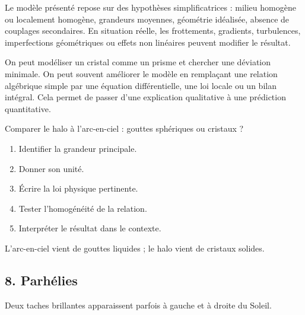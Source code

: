 \documentclass[11pt,a4paper]{article}
\begin{document}
\begin{attentionbox}
Le modèle présenté repose sur des hypothèses simplificatrices : milieu homogène ou localement homogène, grandeurs moyennes, géométrie idéalisée, absence de couplages secondaires. En situation réelle, les frottements, gradients, turbulences, imperfections géométriques ou effets non linéaires peuvent modifier le résultat.
\end{attentionbox}

\begin{approfondissementbox}
On peut modéliser un cristal comme un prisme et chercher une déviation minimale.
On peut souvent améliorer le modèle en remplaçant une relation algébrique simple par une équation différentielle, une loi locale ou un bilan intégral. Cela permet de passer d'une explication qualitative à une prédiction quantitative.
\end{approfondissementbox}

\begin{exercicebox}
Comparer le halo à l'arc-en-ciel : gouttes sphériques ou cristaux ?
\begin{enumerate}
  \item Identifier la grandeur principale.
  \item Donner son unité.
  \item Écrire la loi physique pertinente.
  \item Tester l'homogénéité de la relation.
  \item Interpréter le résultat dans le contexte.
\end{enumerate}
\end{exercicebox}

\begin{corrigebox}[Indication]
L'arc-en-ciel vient de gouttes liquides ; le halo vient de cristaux solides.
\end{corrigebox}


\subsection{8. Parhélies}

\begin{exemplebox}
Deux taches brillantes apparaissent parfois à gauche et à droite du Soleil.
\end{exemplebox}
\end{document}
